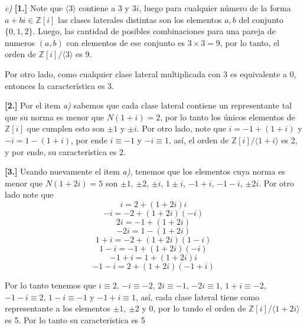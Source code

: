     \textit{c)} \textbf{[1.]} Note que $\langle 3 \rangle$ contiene a $3$ y $3i$, luego para cualquier número de la forma $a +bi \in \mathbb{Z}[i]$ las clases laterales distintas son los elementos $a,b$ del conjunto $\{0, 1, 2\}$. Luego, las cantidad de posibles combinaciones para una pareja de numeros $(a,b)$ con elementos de ese conjunto es $3 \times 3= 9$, por lo tanto, el orden de $\mathbb{Z}[i]/\langle 3 \rangle$ es $9$.

    Por otro lado, como cualquier clase lateral multiplicada con 3 es equivalente a 0, entonces la característica es 3.

    \textbf{[2.]} Por el item \textit{a)} sabemos que cada clase lateral contiene un representante tal que su norma es menor que $N(1 + i) = 2$, por lo tanto los únicos elementos de $\mathbb{Z}[i]$ que cumplen esto son $\pm1$ y $\pm i$. Por otro lado, note que $i = -1 + (1+i)$ y $-i = 1 -(1 + i)$, por ende $i \equiv-1$ y $-i \equiv 1$, así, el orden de $\mathbb{Z}[i]/\langle 1 + i \rangle$ es 2, y por ende, su caracteristica es 2.

    \textbf{[3.]} Usando nuevamente el item \textit{a)}, tenemos que los elementos cuya norma es menor que $N(1 +2i) = 5$ son $\pm 1$, $\pm2$, $\pm i$, $1\pm i$, $-1+i$, $-1-i$, $\pm2i$. Por otro lado note que
    $$i = 2+ (1+2i)i$$
    $$-i = -2+(1+2i)(-i)$$
    $$2i = -1 +(1+2i)$$
    $$-2i = 1 - (1+2i)$$
    $$1 + i = -2 + (1+2i)(1-i)$$
    $$1-i = -1 +(1+2i)(-i)$$
    $$-1+i = 1 + (1+2i)i$$
    $$-1-i = 2 + (1+2i)(-1+i)$$

    Por lo tanto tenemos que $i \equiv2$, $-i \equiv-2$, $2i \equiv -1$, $-2i \equiv 1$, $1+i \equiv -2$, $-1-i \equiv 2$, $1-i \equiv -1$ y $-1+i\equiv 1$, así, cada clase lateral tiene como representante a los elementos $\pm 1$, $\pm 2$ y $0$, por lo tando el orden de $\mathbb{Z}[i]/\langle 1 + 2i \rangle$ es 5. Por lo tanto su caracteristica es 5 

